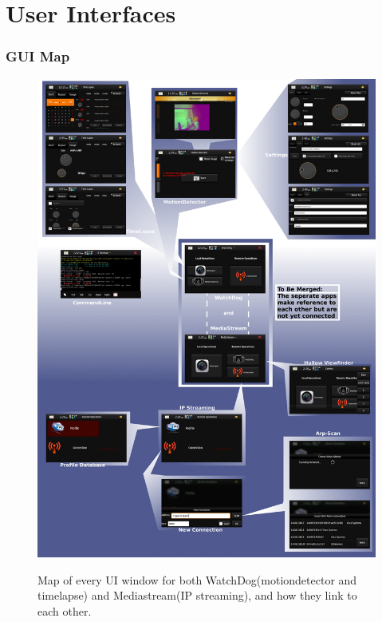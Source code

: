 \documentclass[11pt]{article} %
\begin{document}

\vspace{-20pt}
\part{User Interfaces}
\vspace{-20pt}
\section{GUI Map}\label{guimap}
\begin{figure}[H]
	\vspace{-20pt}
	\begin{center}
		\includegraphics[width=1.1\textwidth]{../images/map}
		\label{img:map}
	\end{center}
	\vspace{-30pt}
	\caption{Map of every UI window for both WatchDog(motiondetector and timelapse) and Mediastream(IP streaming), and how they link to each other.}
\end{figure}
\end{document}
